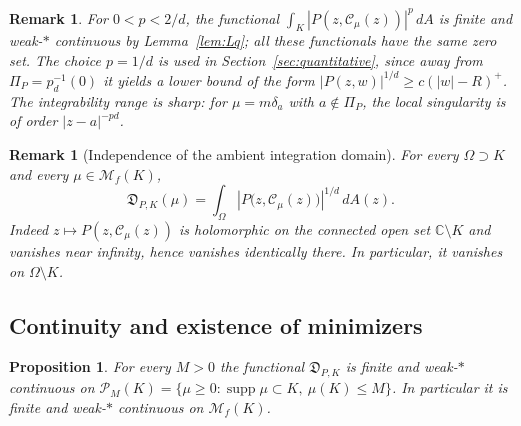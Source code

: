 \documentclass[10pt,a4paper]{amsart}
\newtheorem{proposition}[theorem]{Proposition}
\newtheorem{remark}[theorem]{Remark}
\newcommand{\bC}{\mathbb C}
\newcommand{\M}{\mathcal M}
\newcommand{\Cauchy}{\mathcal C}
\newcommand{\supp}{\operatorname{supp}}
\begin{document}
\begin{remark}\label{rem:exponent}
For $0<p<2/d$, the functional
$\int_K|P(z,\Cauchy_\mu(z))|^p\,dA$ is finite and weak-$*$ continuous by
Lemma~\ref{lem:Lq}; all these functionals have the same zero set.  The choice
$p=1/d$ is used in Section~\ref{sec:quantitative}, since away from
$\Pi_P=p_d^{-1}(0)$ it yields a lower bound of the form
$|P(z,w)|^{1/d}\ge c(|w|-R)^+$.  The integrability range is sharp: for
$\mu=m\delta_a$ with $a\notin\Pi_P$, the local singularity is of order
$|z-a|^{-pd}$.
\end{remark}

\begin{remark}[Independence of the ambient integration domain]
\label{rem:ambient}
For every $\Omega \supset K$ and every $\mu\in\M_f(K)$,
\begin{equation}\label{eq:ambient}
 \mathfrak D_{P,K}(\mu)
 =\int_\Omega
 \left|P\bigl(z,\Cauchy_\mu(z)\bigr)\right|^{1/d}\,dA(z).
\end{equation}
Indeed $z\mapsto P(z,\Cauchy_\mu(z))$ is holomorphic on the connected open set
$\bC\setminus K$ and vanishes near infinity, hence vanishes identically there.
In particular, it vanishes on $\Omega\setminus K$.
\end{remark}

\subsection{Continuity and existence of minimizers}

\begin{proposition}\label{prop:defect-continuity}
For every $M>0$ the functional $\mathfrak D_{P,K}$ is finite and weak-$*$
continuous on
$\mathcal P_M(K)=\{\mu\geq0:\supp\mu\subset K,\ \mu(K)\leq M\}$.  In
particular it is finite and weak-$*$ continuous on $\M_f(K)$.
\end{proposition}
\end{document}
